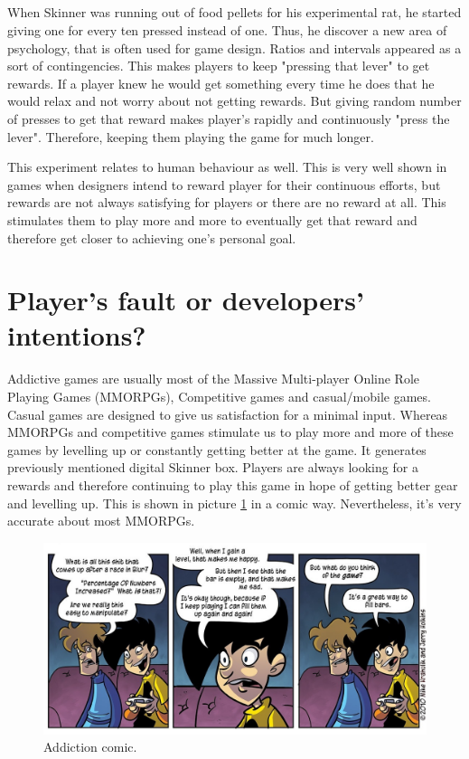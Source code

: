 \documentclass{scrartcl}
\begin{document}
\subsection{}
When Skinner was running out of food pellets for his experimental rat, he started giving one for every ten pressed instead of one\cite{behavioralgd}. Thus, he discover a new area of psychology, that is often used for game design\cite{behavioralgd}. Ratios and intervals appeared as a sort of contingencies. This makes players to keep "pressing that lever" to get rewards. If a player knew he would get something every time he does that he would relax and not worry about not getting rewards\cite{creepyaddiction}. But giving random number of presses to get that reward makes player's rapidly and continuously "press the lever". Therefore, keeping them playing the game for much longer.

This experiment relates to human behaviour as well. This is very well shown in games when designers intend to reward player for their continuous efforts, but rewards are not always satisfying for players or there are no reward at all. This stimulates them to play more and more to eventually get that reward and therefore get closer to achieving one's personal goal.

\section{Player's fault or developers' intentions?}

Addictive games are usually most of the Massive Multi-player Online Role Playing Games (MMORPGs), Competitive games and casual/mobile games. Casual games are designed to give us satisfaction for a minimal input\cite{vgaddiction}. Whereas MMORPGs and competitive games stimulate us to play more and more of these games by levelling up or constantly getting better at the game. It generates previously mentioned digital Skinner box. Players are always looking for a rewards and therefore continuing to play this game in hope of getting better gear and levelling up. This is shown in picture \ref{fig:comic} in a comic way. Nevertheless, it's very accurate about most MMORPGs.

\begin{figure}
  \includegraphics[width=\linewidth]{Images/AddictionComic.jpg}
  \caption{Addiction comic.}
  \label{fig:comic}
\end{figure}
\end{document}
